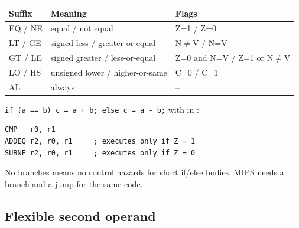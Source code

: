 \begin{center}
\end{center}

\begin{center}
\begin{tabular}{lll}
\toprule
Suffix & Meaning & Flags \\
\midrule
EQ / NE & equal / not equal & Z=1 / Z=0 \\
LT / GE & signed less / greater-or-equal & N$\ne$V / N=V \\
GT / LE & signed greater / less-or-equal & Z=0 and N=V / Z=1 or N$\ne$V \\
LO / HS & unsigned lower / higher-or-same & C=0 / C=1 \\
AL & always & -- \\
\bottomrule
\end{tabular}
\end{center}

\begin{example}
\lstinline[style=c]|if (a == b) c = a + b; else c = a - b;| with
 in :
\begin{lstlisting}[style=arm]
CMP   r0, r1
ADDEQ r2, r0, r1     ; executes only if Z = 1
SUBNE r2, r0, r1     ; executes only if Z = 0
\end{lstlisting}
No branches means no control hazards for short if/else bodies. MIPS needs
a branch and a jump for the same code.
\end{example}

\subsection{Flexible second operand}

